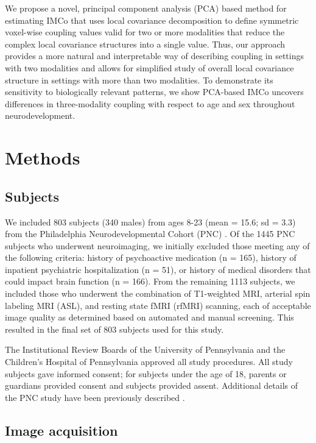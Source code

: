 \documentclass[
  12pt,
]{article}
\begin{document}
We propose a novel, principal component analysis (PCA) based method for estimating IMCo that uses local covariance decomposition to define symmetric voxel-wise coupling values valid for two or more modalities that reduce the complex local covariance structures into a single value. Thus, our approach provides a more natural and interpretable way of describing coupling in settings with two modalities and allows for simplified study of overall local covariance structure in settings with more than two modalities. To demonstrate its sensitivity to biologically relevant patterns, we show PCA-based IMCo uncovers differences in three-modality coupling with respect to age and sex throughout neurodevelopment.

\hypertarget{methods}{%
\section{Methods}\label{methods}}

\hypertarget{subjects}{%
\subsection{Subjects}\label{subjects}}

We included 803 subjects (340 males) from ages 8-23 (mean = 15.6; sd = 3.3) from the Philadelphia Neurodevelopmental Cohort (PNC) \citep{satterthwaite_neuroimaging_2014}. Of the 1445 PNC subjects who underwent neuroimaging, we initially excluded those meeting any of the following criteria: history of psychoactive medication (n = 165), history of inpatient psychiatric hospitalization (n = 51), or history of medical disorders that could impact brain function (n = 166). From the remaining 1113 subjects, we included those who underwent the combination of T1-weighted MRI, arterial spin labeling MRI (ASL), and resting state fMRI (rfMRI) scanning, each of acceptable image quality as determined based on automated and manual screening. This resulted in the final set of 803 subjects used for this study.

The Institutional Review Boards of the University of Pennsylvania and the Children's Hospital of Pennsylvania approved all study procedures. All study subjects gave informed consent; for subjects under the age of 18, parents or guardians provided consent and subjects provided assent. Additional details of the PNC study have been previously described \citep{satterthwaite_neuroimaging_2014}.

\hypertarget{image-acquisition}{%
\subsection{Image acquisition}\label{image-acquisition}}
\end{document}
